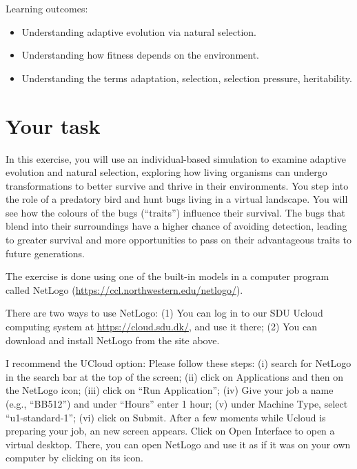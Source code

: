 \documentclass[
  a4paper]{book}
\providecommand{\tightlist}{%
  \setlength{\itemsep}{0pt}\setlength{\parskip}{0pt}}
\begin{document}
\begin{do-something}
Learning outcomes:

\begin{itemize}
\tightlist
\item
  Understanding adaptive evolution via natural selection.
\item
  Understanding how fitness depends on the environment.
\item
  Understanding the terms adaptation, selection, selection pressure,
  heritability.
\end{itemize}
\end{do-something}

\section{Your task}\label{your-task-1}

In this exercise, you will use an individual-based simulation to examine adaptive evolution and natural selection, exploring how living organisms can undergo transformations to better survive and thrive in their environments. You step into the role of a predatory bird and hunt bugs living in a virtual landscape. You will see how the colours of the bugs (``traits'') influence their survival. The bugs that blend into their surroundings have a higher chance of avoiding detection, leading to greater survival and more opportunities to pass on their advantageous traits to future generations.

The exercise is done using one of the built-in models in a computer program called NetLogo (\url{https://ccl.northwestern.edu/netlogo/}).

There are two ways to use NetLogo: (1) You can log in to our SDU Ucloud computing system at \url{https://cloud.sdu.dk/}, and use it there; (2) You can download and install NetLogo from the site above.

I recommend the UCloud option: Please follow these steps: (i) search for NetLogo in the search bar at the top of the screen; (ii) click on Applications and then on the NetLogo icon; (iii) click on ``Run Application''; (iv) Give your job a name (e.g., ``BB512'') and under ``Hours'' enter 1 hour; (v) under Machine Type, select ``u1-standard-1''; (vi) click on Submit. After a few moments while Ucloud is preparing your job, an new screen appears. Click on Open Interface to open a virtual desktop. There, you can open NetLogo and use it as if it was on your own computer by clicking on its icon.
\end{document}
